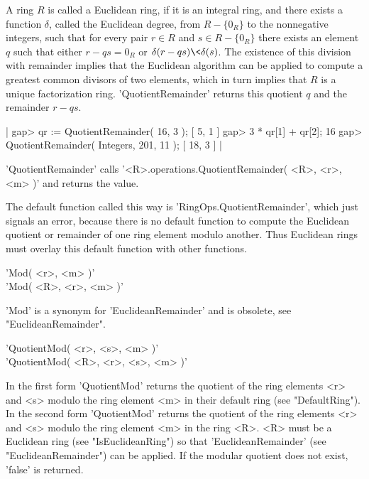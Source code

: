 A ring  $R$  is called a  Euclidean ring, if it  is an integral ring, and
there exists a function  $\delta$,  called  the  Euclidean  degree,  from
$R-\{0_R\}$ to the nonnegative integers, such that for every pair $r  \in
R$ and $s \in R-\{0_R\}$ there exists an element $q$ such  that either $r
- q s  = 0_R$ or $\delta(r - q s) \< \delta( s )$.  The existence of this
division with  remainder  implies  that the  Euclidean  algorithm  can be
applied to compute a greatest  common  divisors of two elements, which in
turn   implies    that   $R$   is    a    unique   factorization    ring.
'QuotientRemainder'  returns  this quotient $q$ and the remainder $r -  q
s$.

|    gap> qr := QuotientRemainder( 16, 3 );
    [ 5, 1 ]
    gap> 3 * qr[1] + qr[2]; 
    16
    gap> QuotientRemainder( Integers, 201, 11 );
    [ 18, 3 ] |

'QuotientRemainder' calls  '<R>.operations.QuotientRemainder(  <R>,  <r>,
<m> )' and returns the value.

The  default  function called  this way  is  'RingOps.QuotientRemainder',
which just  signals an  error,  because  there is no default  function to
compute the Euclidean quotient or  remainder  of one ring element  modulo
another.  Thus Euclidean  rings must  overlay this default function  with
other functions.


'Mod( <r>, <m> )' \\
'Mod( <R>, <r>, <m> )'

'Mod'  is  a  synonym  for  'EuclideanRemainder'  and  is  obsolete,  see
"EuclideanRemainder".


'QuotientMod( <r>, <s>, <m> )' \\
'QuotientMod( <R>, <r>, <s>, <m> )'

In the first form 'QuotientMod' returns the quotient of the ring elements
<r>  and  <s> modulo the  ring element  <m>  in  their default ring  (see
"DefaultRing").  In the second form 'QuotientMod' returns the quotient of
the  ring elements <r> and  <s> modulo the ring element  <m> in  the ring
<R>.   <R>  must  be  a  Euclidean  ring (see  "IsEuclideanRing") so that
'EuclideanRemainder' (see "EuclideanRemainder") can  be  applied.  If the
modular quotient does not exist, 'false' is returned.

